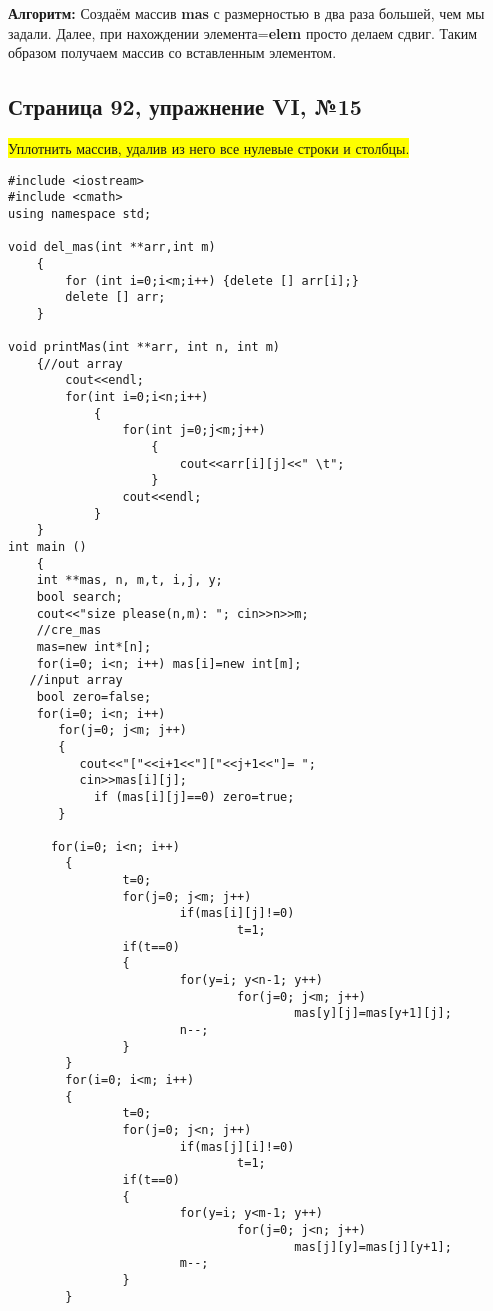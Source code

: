 \documentclass[11pt]{article}
\begin{document}
\begin{flushleft}
\textbf{Алгоритм:}
\newline
Создаём массив \textbf{mas} с размерностью в два раза большей, чем мы задали. Далее, при нахождении элемента=\textbf{elem} просто делаем сдвиг. Таким образом получаем массив со вставленным элементом.

\newpage
\begin{center}
\section{Страница 92, упражнение VI, №15}
\colorbox{yellow}{Уплотнить массив, удалив из него все нулевые строки и столбцы.}
\end{center}
\begin{lstlisting}
#include <iostream>
#include <cmath>
using namespace std;

void del_mas(int **arr,int m)
    {
        for (int i=0;i<m;i++) {delete [] arr[i];}
        delete [] arr;
    }    

void printMas(int **arr, int n, int m)
    {//out array
        cout<<endl;
        for(int i=0;i<n;i++)
            {
                for(int j=0;j<m;j++)
                    {
                        cout<<arr[i][j]<<" \t";
                    }
                cout<<endl;
            }
    }
int main ()
    {
    int **mas, n, m,t, i,j, y;
    bool search;
    cout<<"size please(n,m): "; cin>>n>>m;
    //cre_mas
    mas=new int*[n]; 
    for(i=0; i<n; i++) mas[i]=new int[m];
   //input array
    bool zero=false;
    for(i=0; i<n; i++)
       for(j=0; j<m; j++)
       {
          cout<<"["<<i+1<<"]["<<j+1<<"]= ";
          cin>>mas[i][j]; 
            if (mas[i][j]==0) zero=true;
       }

      for(i=0; i<n; i++)
        {
                t=0;
                for(j=0; j<m; j++)
                        if(mas[i][j]!=0)
                                t=1;
                if(t==0)
                {
                        for(y=i; y<n-1; y++)
                                for(j=0; j<m; j++)
                                        mas[y][j]=mas[y+1][j];
                        n--;
                }
        }
        for(i=0; i<m; i++)
        {
                t=0;
                for(j=0; j<n; j++)
                        if(mas[j][i]!=0)
                                t=1;
                if(t==0)
                {
                        for(y=i; y<m-1; y++)
                                for(j=0; j<n; j++)
                                        mas[j][y]=mas[j][y+1];
                        m--;
                }
        }


\end{lstlisting}
\end{flushleft}
\end{document}
